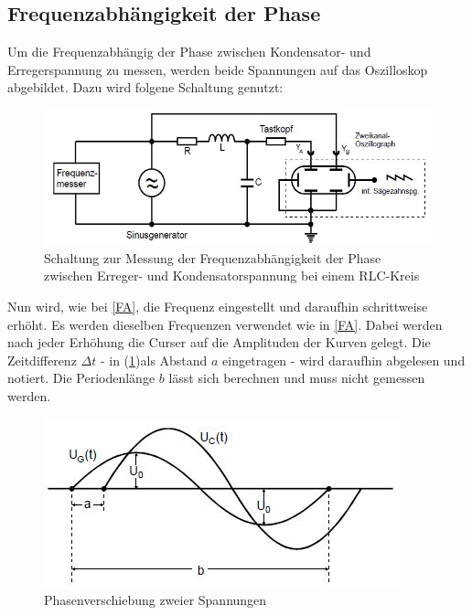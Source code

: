 \subsection{Frequenzabhängigkeit der Phase}
Um die Frequenzabhängig der Phase zwischen Kondensator- und Erregerspannung zu messen, werden beide Spannungen
auf das Oszilloskop abgebildet. Dazu wird folgene Schaltung genutzt:
\begin{figure}[H]
  \centering
  \includegraphics[width=\textwidth]{Text/Frequenzmesser2.jpg}
  \caption{Schaltung zur Messung der Frequenzabhängigkeit der Phase zwischen Erreger- und Kondensatorspannung bei einem RLC-Kreis \cite[296]{sample}}
  \label{fig:Aufbau4}
\end{figure}
Nun wird, wie bei \ref{FA}, die Frequenz eingestellt und daraufhin schrittweise erhöht.
Es werden dieselben Frequenzen verwendet wie in \ref{FA}.
Dabei werden nach jeder Erhöhung die Curser auf die Amplituden der Kurven gelegt. Die Zeitdifferenz $\Delta t$
- in (\ref{fig:Aufbau4})als Abstand $a$ eingetragen - wird daraufhin abgelesen und notiert.
Die Periodenlänge $b$ lässt sich berechnen und muss nicht gemessen werden.
\begin{figure}[H]
  \centering
  \includegraphics{Text/Kurven.jpg}
  \caption{Phasenverschiebung zweier Spannungen \cite[282]{sample2}}
  \label{fig:Aufbau5}
\end{figure}
